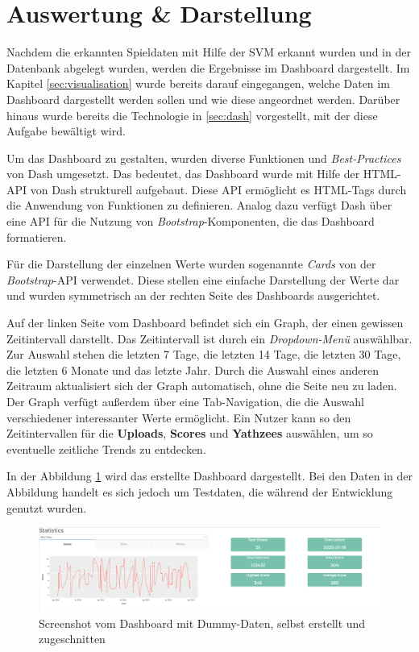 \section{Auswertung \& Darstellung} \label{sec:dashboard}
Nachdem die erkannten Spieldaten mit Hilfe der SVM erkannt wurden und in der Datenbank abgelegt wurden, werden die Ergebnisse im Dashboard dargestellt. Im Kapitel \ref{sec:visualisation} wurde bereits darauf eingegangen, welche Daten im Dashboard dargestellt werden sollen und wie diese angeordnet werden. Darüber hinaus wurde bereits die Technologie in \ref{sec:dash} vorgestellt, mit der diese Aufgabe bewältigt wird.

Um das Dashboard zu gestalten, wurden diverse Funktionen und \textit{Best-Practices} von Dash umgesetzt. Das bedeutet, das Dashboard wurde mit Hilfe der HTML-API von Dash strukturell aufgebaut. Diese API ermöglicht es HTML-Tags durch die Anwendung von Funktionen zu definieren. Analog dazu verfügt Dash über eine API für die Nutzung von \textit{Bootstrap}-Komponenten, die das Dashboard formatieren. \cite{plotly}

Für die Darstellung der einzelnen Werte wurden sogenannte \textit{Cards} von der \textit{Bootstrap}-API verwendet. Diese stellen eine einfache Darstellung der Werte dar und wurden symmetrisch an der rechten Seite des Dashboards ausgerichtet.

Auf der linken Seite vom Dashboard befindet sich ein Graph, der einen gewissen Zeitintervall darstellt. Das Zeitintervall ist durch ein \textit{Dropdown-Menü} auswählbar. Zur Auswahl stehen die letzten 7 Tage, die letzten 14 Tage, die letzten 30 Tage, die letzten 6 Monate und das letzte Jahr. Durch die Auswahl eines anderen Zeitraum aktualisiert sich der Graph automatisch, ohne die Seite neu zu laden.
Der Graph verfügt außerdem über eine Tab-Navigation, die die Auswahl verschiedener interessanter Werte ermöglicht. Ein Nutzer kann so den Zeitintervallen für die \textbf{Uploads}, \textbf{Scores} und \textbf{Yathzees} auswählen, um so eventuelle zeitliche Trends zu entdecken.

In der Abbildung \ref{fig:dashboard} wird das erstellte Dashboard dargestellt. Bei den Daten in der Abbildung handelt es sich jedoch um Testdaten, die während der Entwicklung genutzt wurden. 

\begin{figure}[H]
	\centering
	\includegraphics[width=\imgMed]{images/practice/screenshot_dashboard.png}
	\caption{Screenshot vom Dashboard mit Dummy-Daten, selbst erstellt und zugeschnitten}
	\label{fig:dashboard}
\end{figure}

